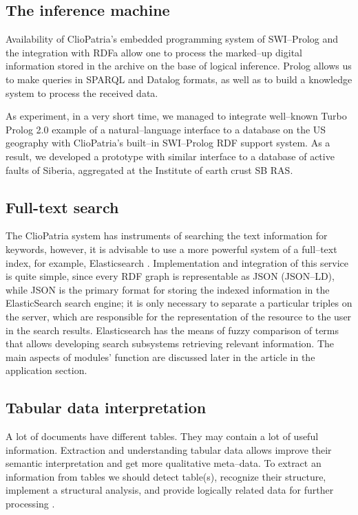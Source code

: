 \documentclass[12pt]{llncs}
\begin{document}
\subsection{The inference machine}

Availability of ClioPatria's embedded programming system of SWI--Prolog
\cite{b10} and the integration with RDFa allow one to process the
marked--up digital information stored in the archive on the base of
logical inference. Prolog allows us to make queries in SPARQL and
Datalog formats, as well as to build a knowledge system to process the
received data.

As experiment, in a very short time, we managed to integrate well--known
Turbo Prolog 2.0 example of a natural--language interface to a database
on the US geography with ClioPatria's built--in SWI--Prolog RDF support
system. As a result, we developed a prototype with similar interface to
a database of active faults of Siberia, aggregated at the Institute of
earth crust SB RAS.


\subsection{Full-text search}

The ClioPatria system has instruments of searching the text information
for keywords, however, it is advisable to use a more powerful system of
a full--text index, for example, Elasticsearch \cite{b13}. Implementation
and integration of this service is quite simple, since every RDF graph
is representable as JSON (JSON--LD), while JSON is the primary format for
storing the indexed information in the ElasticSearch search engine; it
is only necessary to separate a particular triples on the server, which
are responsible for the representation of the resource to the user in
the search results. Elasticsearch has the means of fuzzy comparison of
terms that allows developing search subsystems retrieving relevant
information. The main aspects of modules' function are discussed later
in the article in the application section.


\subsection{Tabular data interpretation}

A lot of documents have different tables. They may contain a lot of useful information. Extraction and understanding tabular data allows improve their semantic interpretation and get more qualitative meta--data. To extract an information from tables we should detect table(s), recognize their structure, implement a structural analysis, and provide logically related data for further processing \cite{Shigarov_2017}.
\end{document}
